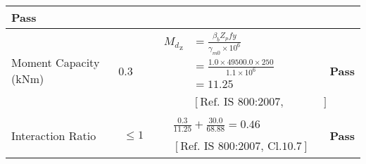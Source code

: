 \documentclass{article}%
\begin{document}
\begin{longtable}{|p{3.5cm}|p{5cm}|p{6cm}|p{1.5cm}|}
{\textbf{Pass}
}\\%
\hline%
Moment Capacity (kNm)&0.3&$\begin{aligned} {M_{d}}_{\text{z}} &= \frac{\beta_b Z_p fy}{\gamma_{m0} \times 10^6}\\ &=\frac{1.0\times49500.0\times250}{1.1 \times 10^6}\\ &=11.25\\ \\ & [\text{Ref. IS 800:2007, Cl.8.2.1.2}] \end{aligned}$&\textcolor{OsdagGreen}{ 
\textbf{Pass}
}\\%
\hline%
Interaction Ratio&$\begin{aligned} \leq1\end{aligned}$&$\begin{aligned} &\frac{0.3}{11.25}+\frac{30.0}{68.88}=0.46\\ \\ & [\text{Ref. IS 800:2007, Cl.10.7}] \end{aligned}$&\textcolor{OsdagGreen}{ 
\textbf{Pass}
}\\%
\hline%
\end{longtable}

%
%
\end{document}
